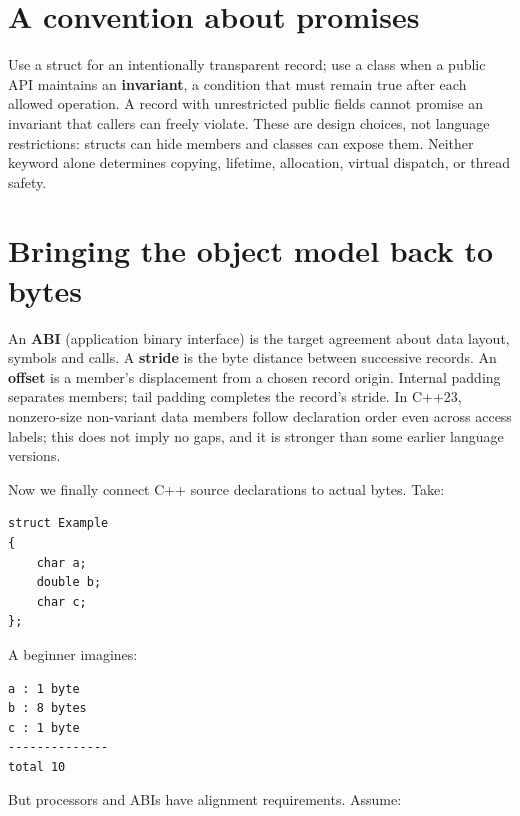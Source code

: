 \section{A convention about promises}\label{05-engine-i-ch003-a-convention-about-promises}

\hypertarget{05-engine-i-ch003-a-convention-about-promises}{}

Use a struct for an intentionally transparent record; use a class when a public API maintains an \textbf{invariant}, a condition that must remain true after each allowed operation. A record with unrestricted public fields cannot promise an invariant that callers can freely violate. These are design choices, not language restrictions: structs can hide members and classes can expose them. Neither keyword alone determines copying, lifetime, allocation, virtual dispatch, or thread safety.

\section{Bringing the object model back to bytes}\label{05-engine-i-ch003-bringing-the-object-model-back-to-bytes}

\hypertarget{05-engine-i-ch003-bringing-the-object-model-back-to-bytes}{}

An \textbf{ABI} (application binary interface) is the target agreement about data layout, symbols and calls. A \textbf{stride} is the byte distance between successive records. An \textbf{offset} is a member's displacement from a chosen record origin. Internal padding separates members; tail padding completes the record's stride. In C++23, nonzero-size non-variant data members follow declaration order even across access labels; this does not imply no gaps, and it is stronger than some earlier language versions.

Now we finally connect C++ source declarations to actual bytes. Take:

\begin{verbatim}
struct Example
{
    char a;
    double b;
    char c;
};
\end{verbatim}

A beginner imagines:

\begin{verbatim}
a : 1 byte
b : 8 bytes
c : 1 byte
--------------
total 10
\end{verbatim}

But processors and ABIs have alignment requirements. Assume:

